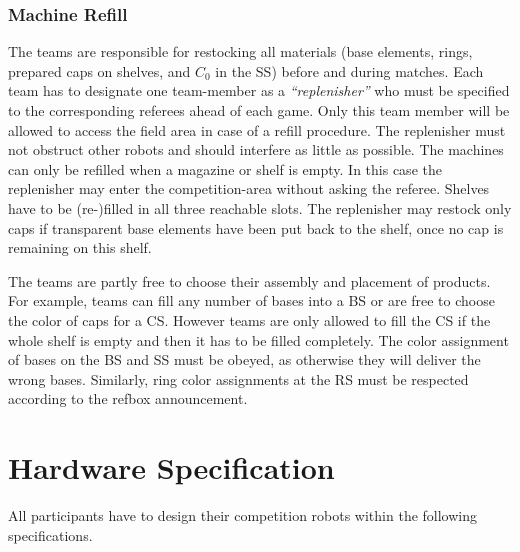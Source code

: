 \documentclass[12pt,twoside]{article}
\begin{document}
\subsubsection{Machine Refill}
\label{sec:machine-refill}
The teams are responsible for restocking all materials (base elements,
rings, prepared caps on shelves, and $C_0$ in the \ac{SS}) before and
during matches.
Each team has to designate one team-member as a \textit{``replenisher''} who
must be specified to the corresponding referees ahead of each
game. Only this team member will be allowed to access the field area in case of
a refill procedure. The replenisher must not obstruct other
robots and should interfere as little as possible.  The machines can only be
refilled when a magazine or shelf is empty. In this case the replenisher may
enter the competition-area without asking the referee. Shelves have to be
(re-)filled in all three reachable slots. %
The replenisher may restock only caps if transparent base elements have been put
back to the shelf, once no cap is remaining on this shelf.

The teams are partly free to choose their assembly and placement of products.
For example, teams can fill any number of bases into a \ac{BS} or are free
to choose the color of caps for a \ac{CS}.
However teams are only allowed to fill the \ac{CS} if the
whole shelf is empty and then it has to be filled completely.
The color assignment of bases on the \ac{BS} and \ac{SS} must be obeyed,
as otherwise they will deliver the wrong bases.
Similarly, ring color assignments at the \ac{RS} must be
respected according to the \ac{refbox} announcement.


\section{Hardware Specification}
\label{sec:robotino}

All participants have to design their competition robots within the
following specifications.
\end{document}
